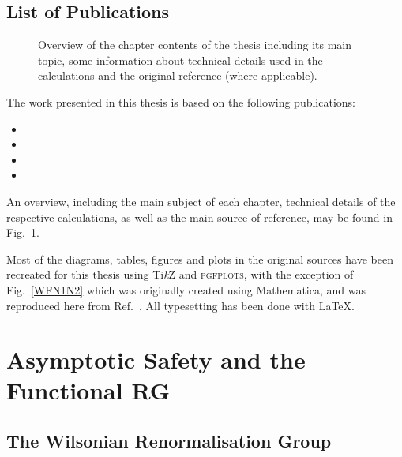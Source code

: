 \documentclass[11pt]{book} %
\newcommand{\TikZ}{Ti\emph{k}Z }
\newcommand{\pgfplots}{\textsc{pgfplots}}
\numberwithin{equation}{chapter}
\begin{document}
\section*{List of Publications}

\begin{figure}
  \begin{center}
    
  \end{center}
  \caption{
    Overview of the chapter contents of the thesis including its main topic, some information
    about technical details used in the calculations and the original reference (where applicable).
  }
  \label{fig:overview}
\end{figure}

The work presented in this thesis is based on the following publications:%
\bigskip
\begin{itemize}
  \setlength\itemsep{0.7em}
  \item {}
  \item {}
  \item {}
  \item {}
\end{itemize}
\bigskip
An overview, including the main subject of each chapter, technical details
of the respective calculations, as well as the main source of reference, may be found in
Fig.~\ref{fig:overview}.

Most of the diagrams, tables, figures and plots in the original
sources have been recreated for this thesis using \TikZ and \pgfplots, with the exception
of Fig.~\ref{WFN1N2} which was originally created using Mathematica,
and was reproduced here from Ref.~\cite{Labus:2015ska}.
All typesetting has been done with \LaTeX.



\mainmatter
\chapter[Asymptotic Safety and the Functional Renormalisation Group]{Asymptotic Safety and the Functional RG}

\section{The Wilsonian Renormalisation Group}
\end{document}
